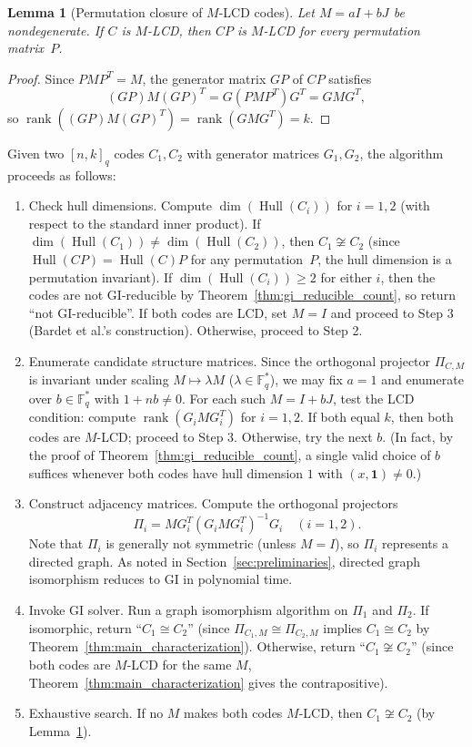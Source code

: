 \documentclass[11pt]{article}
\newcommand{\FF}{\mathbb{F}}
\newcommand{\0}{\mathbf{0}}
\newcommand{\1}{\mathbf{1}}
\DeclareMathOperator{\Hull}{Hull}
\DeclareMathOperator{\rank}{rank}
\theoremstyle{plain}
\newtheorem{lemma}[theorem]{Lemma}
\theoremstyle{definition}
\theoremstyle{remark}
\begin{document}
\begin{lemma}[Permutation closure of $M$-LCD codes]
\label{lem:permutation_closure}
Let $M = aI + bJ$ be nondegenerate. If $C$ is $M$-LCD, then $CP$ is $M$-LCD for every permutation matrix~$P$.
\end{lemma}
\begin{proof}
Since $PMP^T = M$, the generator matrix $GP$ of $CP$ satisfies
$$
(GP)M(GP)^T = G(PMP^T)G^T = GMG^T,
$$
so $\rank((GP)M(GP)^T) = \rank(GMG^T) = k$.
\end{proof}

Given two $[n,k]_q$ codes $C_1, C_2$ with generator matrices $G_1, G_2$, the algorithm proceeds as follows:
\begin{enumerate}
\item Check hull dimensions. Compute $\dim(\Hull(C_i))$ for $i=1,2$ (with respect to the standard inner product). If $\dim(\Hull(C_1)) \neq \dim(\Hull(C_2))$, then $C_1 \not\cong C_2$ (since $\Hull(CP) = \Hull(C)P$ for any permutation~$P$, the hull dimension is a permutation invariant). If $\dim(\Hull(C_i)) \geq 2$ for either $i$, then the codes are not GI-reducible by Theorem~\ref{thm:gi_reducible_count}, so return ``not GI-reducible''. If both codes are LCD, set $M = I$ and proceed to Step 3 (Bardet et al.'s construction). Otherwise, proceed to Step 2.

\item Enumerate candidate structure matrices. Since the orthogonal projector $\Pi_{C,M}$ is invariant under scaling $M \mapsto \lambda M$ ($\lambda \in \FF_q^*$), we may fix $a = 1$ and enumerate over $b \in \FF_q^*$ with $1 + nb \neq 0$. For each such $M = I + bJ$, test the LCD condition: compute $\rank(G_i M G_i^T)$ for $i=1,2$. If both equal $k$, then both codes are $M$-LCD; proceed to Step 3. Otherwise, try the next $b$. (In fact, by the proof of Theorem~\ref{thm:gi_reducible_count}, a single valid choice of $b$ suffices whenever both codes have hull dimension $1$ with $(x,\1) \neq 0$.)

\item Construct adjacency matrices. Compute the orthogonal projectors
\[
\Pi_i = M G_i^T (G_i M G_i^T)^{-1} G_i \quad (i=1,2).
\]
Note that $\Pi_i$ is generally not symmetric (unless $M = I$), so $\Pi_i$ represents a directed graph. As noted in Section~\ref{sec:preliminaries}, directed graph isomorphism reduces to GI in polynomial time.

\item Invoke GI solver. Run a graph isomorphism algorithm on $\Pi_1$ and $\Pi_2$. If isomorphic, return ``$C_1 \cong C_2$'' (since $\Pi_{C_1,M} \cong \Pi_{C_2,M}$ implies $C_1 \cong C_2$ by Theorem~\ref{thm:main_characterization}). Otherwise, return ``$C_1 \not\cong C_2$'' (since both codes are $M$-LCD for the same $M$, Theorem~\ref{thm:main_characterization} gives the contrapositive).

\item Exhaustive search. If no $M$ makes both codes $M$-LCD, then $C_1 \not\cong C_2$ (by Lemma~\ref{lem:permutation_closure}).
\end{enumerate}
\end{document}
